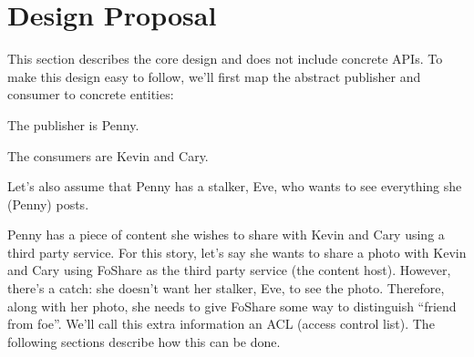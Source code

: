 \documentclass[pdftex,12pt,a4papaer]{article}
\begin{document}
\begin{comment}
\subsection{Decentralised Access Control}

Decentralized access control systems such as the one proposed in this document
offer the same benefits as centralized access control systems but without the
drawbacks of being a centralized system. That is, users can freely choose
between providers or run their own. 

Other systems have attempted to address this problem including \cite{attrib}
\cite{privattrib} \cite{drbac} \cite{socnet} and the Kerberos Consortium's User
Managed Access (UMA)~\cite{uma}. Unfortunately, while both \cite{attrib} and
\cite{privattrib} describe cryptographic protocols for privacy preserving
decentralized access control, neither attempt to design an implementable system.
UMA\cite{uma} \cite{drbac} and \cite{socnet} provide a more thorough system
designs (UMA even provides a system specification) but all fail to even address
the question of user privacy.

\end{comment}

\section{Design Proposal}

This section describes the core design and does not include concrete APIs. To
make this design easy to follow, we'll first map the abstract publisher and
consumer to concrete entities:

\begin{compactitem}
    \item The publisher is Penny.
    \item The consumers are Kevin and Cary.
\end{compactitem}

Let's also assume that Penny has a stalker, Eve, who wants to see everything she
(Penny) posts.

Penny has a piece of content she wishes to share with Kevin and Cary using a
third party service. For this story, let's say she wants to share a photo with
Kevin and Cary using FoShare as the third party service (the content host).
However, there's a catch: she doesn't want her stalker, Eve, to see the photo.
Therefore, along with her photo, she needs to give FoShare some way to
distinguish ``friend from foe''. We'll call this extra information an ACL (access
control list). The following sections describe how this can be done.
\end{document}
